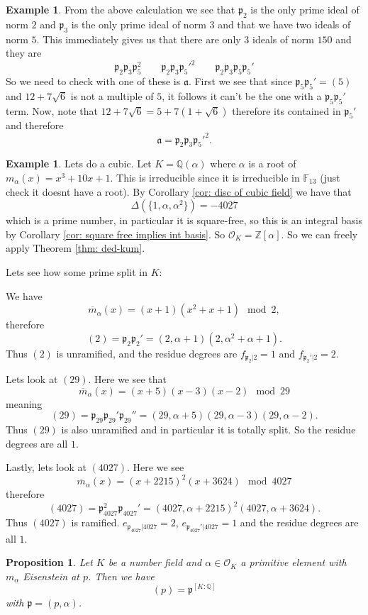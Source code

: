 \documentclass[11pt,a4paper]{report}
\theoremstyle{plain}
\newtheorem{prop}[subsection]{Proposition}
\theoremstyle{definition}
\newtheorem{exmp}[subsection]{Example}
\theoremstyle{definition}
\newcommand{\ZZ}{\mathbb{Z}}
\def\FF{\mathbb{F}}
\def\QQ{\mathbb{Q}}
\def\gothp{\mathfrak{p}}
\def \a{\alpha}
\def \OO {\mathcal{O}}
\def \ov{\overline}
\def\gotha{\mathfrak{a}}
\begin{document}
\begin{exmp}
From the above calculation we see that $\gothp_2$ is the only prime ideal of norm $2$ and $\gothp_3$ is the only prime ideal of norm $3$ and that we have two ideals of norm $5$. This immediately gives us that there are only 3 ideals of norm $150$ and they are \[\gothp_2\gothp_3\gothp_5^2 \qquad \gothp_2\gothp_3\gothp_5'^2 \qquad \gothp_2\gothp_3\gothp_5\gothp_5'\] So we need to check with one of these is $\gotha$. First we see that since $\gothp_5\gothp_5'=(5)$ and $12+7\sqrt{6}$ is not a multiple of $5$, it follows it can't be the one with a $\gothp_5\gothp_5'$ term. Now, note that $12+7\sqrt{6}=5+7(1+\sqrt{6})$ therefore its contained in $\gothp_5'$ and therefore \[\gotha=\gothp_2\gothp_3\gothp_5'^2.\] 



\end{exmp}

\begin{exmp}
Lets do a cubic. Let $K=\QQ(\a)$ where $\a$ is a root of $m_\a(x)=x^3+10x+1$. This is irreducible since it is irreducible in $\FF_{13}$ (just check it doesnt have a root).  By Corollary \ref{cor: disc of cubic field} we have that \[\Delta(\{1,\a,\a^2\})=-4027\] which is a prime number, in particular it is square-free, so this is an integral basis by Corollary \ref{cor: square free implies int basis}. So $\OO_K=\ZZ[\a]$. So we can freely apply Theorem \ref{thm: ded-kum}.

Lets see how some prime split in $K$:

We have \[\ov{m}_\a(x)=(x+1)(x^2+x+1) \mod 2,\] therefore \[(2)=\gothp_2\gothp_2'=(2,\a+1)(2,\a^2+\a+1).\] Thus $(2)$ is unramified, and the residue degrees are $f_{\gothp_2|2}=1$ and $f_{\gothp_2'|2}=2$. 

Lets look at $(29)$. Here we see that \[\ov{m}_\a(x)=(x+5)(x-3)(x-2) \mod 29\] meaning \[(29)=\gothp_{29}\gothp_{29}'\gothp_{29}''=(29,\a+5)(29,\a-3)(29,\a-2).\] Thus $(29)$ is also unramified and in particular it is totally split. So the residue degrees are all $1$.

Lastly, lets look at $(4027)$. Here we see \[\ov{m}_\a(x)=(x+2215)^2(x+3624) \mod 4027\] therefore \[(4027)=\gothp_{4027}^2\gothp_{4027}'=(4027,\a+2215)^2(4027,\a+3624).\] Thus $(4027)$ is ramified. $e_{\gothp_{4027}|4027}=2$, $e_{\gothp_{4027}'|4027}=1$ and the residue degrees are all $1$.

\end{exmp}
\begin{prop}
Let $K$ be a number field and $\a \in \OO_K$ a primitive element with $m_\a$ Eisenstein at $p$. Then we have \[(p)=\gothp^{[K:\QQ]}\] with $\gothp=(p,\a)$.
\end{prop}
\end{document}
